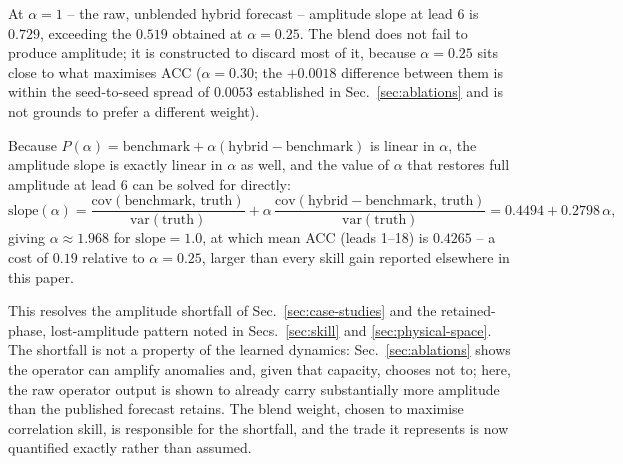 At $\alpha=1$ -- the raw, unblended hybrid forecast -- amplitude slope at lead 6 is $0.729$,
exceeding the $0.519$ obtained at $\alpha=0.25$. The blend does not fail to produce amplitude;
it is constructed to discard most of it, because $\alpha=0.25$ sits close to what maximises
ACC ($\alpha=0.30$; the $+0.0018$ difference between them is within the seed-to-seed spread of
$0.0053$ established in Sec.~\ref{sec:ablations} and is not grounds to prefer a different
weight).

Because $P(\alpha)=\mathrm{benchmark}+\alpha(\mathrm{hybrid}-\mathrm{benchmark})$ is linear in
$\alpha$, the amplitude slope is exactly linear in $\alpha$ as well, and the value of $\alpha$
that restores full amplitude at lead 6 can be solved for directly:
\[
\mathrm{slope}(\alpha) = \frac{\mathrm{cov}(\mathrm{benchmark},\,\mathrm{truth})}
{\mathrm{var}(\mathrm{truth})} + \alpha\,\frac{\mathrm{cov}(\mathrm{hybrid}-
\mathrm{benchmark},\,\mathrm{truth})}{\mathrm{var}(\mathrm{truth})}
= 0.4494 + 0.2798\,\alpha,
\]
giving $\alpha \approx 1.968$ for $\mathrm{slope}=1.0$, at which mean ACC (leads 1--18) is
$0.4265$ -- a cost of $0.19$ relative to $\alpha=0.25$, larger than every skill gain reported
elsewhere in this paper.

This resolves the amplitude shortfall of Sec.~\ref{sec:case-studies} and the retained-phase,
lost-amplitude pattern noted in Secs.~\ref{sec:skill} and \ref{sec:physical-space}. The
shortfall is not a property of the learned dynamics: Sec.~\ref{sec:ablations} shows the
operator can amplify anomalies and, given that capacity, chooses not to; here, the raw
operator output is shown to already carry substantially more amplitude than the published
forecast retains. The blend weight, chosen to maximise correlation skill, is responsible for
the shortfall, and the trade it represents is now quantified exactly rather than assumed.
